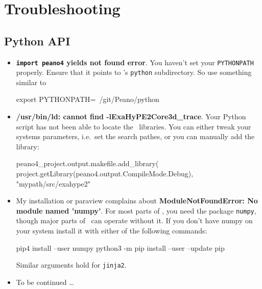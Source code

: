 \chapter{Troubleshooting}
\label{chapter:troubleshooting}


\section{Python API}

\begin{itemize}
  \item \textbf{\texttt{import peano4} yields not found error}. You haven't set
  your \texttt{PYTHONPATH} properly. Ensure that it points to \Peano's
  \texttt{python} subdirectory. So use something similar to 
  \begin{bash}
export PYTHONPATH=~/git/Peano/python
  \end{bash}
  \item \textbf{/usr/bin/ld: cannot find -lExaHyPE2Core3d\_trace}. Your Python
  script has not been able to locate the \Peano\ libraries. You can either tweak
  your systems parameters, i.e.~set the search pathes, or you can manually add
  the library:
\begin{code}
peano4_project.output.makefile.add_library(
  project.getLibrary(peano4.output.CompileMode.Debug), 
  "mypath/src/exahype2" 
\end{code}
  \item My installation or paraview complains about \textbf{ModuleNotFoundError:
    No module named 'numpy'}.
    For most parts of \Peano, you need the package \texttt{numpy}, though major
    parts of \Peano\ can operate without it. If you don't have numpy on your
    system install it with either of the following commands:
  \begin{bash}
pip4 install --user numpy
python3 -m pip install --user --update pip
  \end{bash}
    Similar arguments hold for \texttt{jinja2}.
  \item To be continued \dots
\end{itemize}








